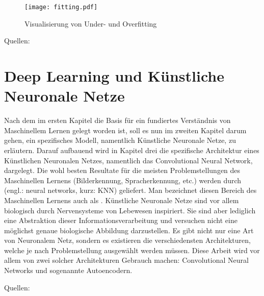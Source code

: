 \begin{figure}[h!]
  \centering
  \texttt{[image: fitting.pdf]}
  \caption{Visualisierung von Under- und Overfitting}
\end{figure}
\para{}
Quellen: \cite{wiki:overfitting} \cite{Goodfellow-et-al-2016} \cite{book:hands-on}


\chapter{Deep Learning und Künstliche Neuronale Netze}
Nach dem im ersten Kapitel die Basis für ein fundiertes Verständnis von
Maschinellem Lernen gelegt worden ist, soll es nun im zweiten Kapitel darum
gehen, ein spezifisches Modell, namentlich Künstliche Neuronale Netze, zu
erläutern. Darauf aufbauend wird in Kapitel drei die spezifische Architektur
eines Künstlichen Neuronalen Netzes, namentlich das Convolutional Neural Network,
dargelegt.
\para{}
\bigskip
Die wohl besten Resultate für die meisten Problemstellungen des Maschinellen Lernens (Bilderkennung,
Spracherkennung, etc.) werden durch  (engl.:
neural networks, kurz: KNN) geliefert.
Man bezeichnet diesen Bereich des Maschinellen Lernens auch als .
\para{}
Künstliche Neuronale Netze sind vor allem biologisch durch Nervensysteme von
Lebewesen inspiriert.
Sie sind aber lediglich eine Abstraktion dieser Informationsverarbeitung und
versuchen nicht eine möglichst genaue biologische Abbildung darzustellen.
Es gibt nicht nur eine Art von Neuronalem Netz, sondern es existieren die
verschiedensten Architekturen, welche je nach Problemstellung ausgewählt werden
müssen. Diese Arbeit wird vor allem von zwei solcher Architekturen Gebrauch machen:
Convolutional Neural Networks und sogenannte Autoencodern.

\para{}
Quellen: \cite{book:hands-on}

